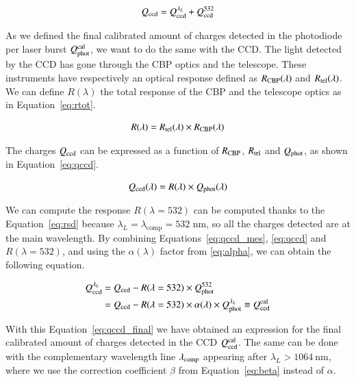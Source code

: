 \begin{equation}
    Q_{\mathrm{ccd}} = Q_{\mathrm{ccd}}^{\lambda_L} + Q_{\mathrm{ccd}}^{532}
    \label{eq:qccd_mes}
\end{equation}

As we defined the final calibrated amount of charges detected in the photodiode per laser burst $Q_{\mathrm{phot}}^{\rm cal}$, we want to do the same with the \SD CCD. The light detected by the \SD CCD has gone through the CBP optics and the \SD telescope. These instruments have respectively an optical response defined as $R_{\mathrm{CBP}}(\lambda)$ and $R_{\mathrm{tel}}(\lambda)$. We can define $R(\lambda)$ the total response of the CBP and the \SD telescope optics as in Equation~\ref{eq:rtot}. 

\begin{equation}
    R(\lambda) = R_{\mathrm{tel}}(\lambda) \times R_{\mathrm{CBP}}(\lambda)
    \label{eq:rtot}
\end{equation}

The charges $Q_{\mathrm{ccd}}$ can be expressed as a function of $R_{\mathrm{CBP}}$, $R_{\mathrm{tel}}$ and $Q_{\mathrm{phot}}$, as shown in Equation~\ref{eq:qccd}. 

\begin{equation}
    Q_{\mathrm{ccd}}(\lambda) = R(\lambda) \times Q_{\mathrm{phot}}(\lambda)
    \label{eq:qccd}
\end{equation}

We can compute the response $R(\lambda=532)$ can be computed thanks to the Equation~\ref{eq:rsd} because $\lambda_L = \lambda_\mathrm{comp} = 532$ nm, so all the charges detected are at the main wavelength. By combining Equations~\ref{eq:qccd_mes}, \ref{eq:qccd} and $R(\lambda=532)$, and using the $\alpha(\lambda)$ factor from \ref{eq:alpha}, we can obtain the following equation.

\begin{equation}
\begin{aligned}
    Q_{\mathrm{ccd}}^{\lambda_L} & = Q_{\mathrm{ccd}} - R(\lambda=532) \times Q_{\mathrm{phot}}^{532} \\ 
    & = Q_{\mathrm{ccd}} - R(\lambda=532) \times \alpha(\lambda) \times Q_{\mathrm{phot}}^{\lambda_L} \equiv Q_{\mathrm{ccd}}^{\rm cal}
    \label{eq:qccd_final}
\end{aligned}
\end{equation}

With this Equation~\ref{eq:qccd_final} we have obtained an expression for the final calibrated amount of charges detected in the \SD CCD $Q_{\mathrm{ccd}}^{\rm cal}$. The same can be done with the complementary wavelength line $\lambda_{\rm comp}$ appearing after $\lambda_L > \SI{1064}{\nm}$, where we use the correction coefficient $\beta$ from Equation~\ref{eq:beta} instead of $\alpha$.

